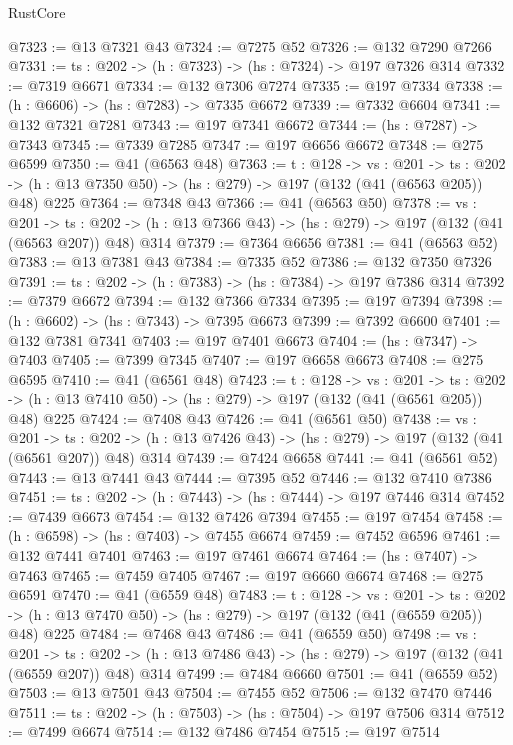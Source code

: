\begin{lexlean}{RustCore}
\begin{coremodule}
@7323 := @13 @7321 @43
@7324 := @7275 @52
@7326 := @132 @7290 @7266
@7331 := {ts : @202} -> (h : @7323) -> (hs : @7324) -> @197 @7326 @314
@7332 := @7319 @6671
@7334 := @132 @7306 @7274
@7335 := @197 @7334
@7338 := (h : @6606) -> (hs : @7283) -> @7335 @6672
@7339 := @7332 @6604
@7341 := @132 @7321 @7281
@7343 := @197 @7341 @6672
@7344 := (hs : @7287) -> @7343
@7345 := @7339 @7285
@7347 := @197 @6656 @6672
@7348 := @275 @6599
@7350 := @41 (@6563 @48)
@7363 := {t : @128} ->
  {vs : @201} ->
  {ts : @202} -> (h : @13 @7350 @50) -> (hs : @279) -> @197 (@132 (@41 (@6563 @205)) @48) @225
@7364 := @7348 @43
@7366 := @41 (@6563 @50)
@7378 := {vs : @201} ->
  {ts : @202} -> (h : @13 @7366 @43) -> (hs : @279) -> @197 (@132 (@41 (@6563 @207)) @48) @314
@7379 := @7364 @6656
@7381 := @41 (@6563 @52)
@7383 := @13 @7381 @43
@7384 := @7335 @52
@7386 := @132 @7350 @7326
@7391 := {ts : @202} -> (h : @7383) -> (hs : @7384) -> @197 @7386 @314
@7392 := @7379 @6672
@7394 := @132 @7366 @7334
@7395 := @197 @7394
@7398 := (h : @6602) -> (hs : @7343) -> @7395 @6673
@7399 := @7392 @6600
@7401 := @132 @7381 @7341
@7403 := @197 @7401 @6673
@7404 := (hs : @7347) -> @7403
@7405 := @7399 @7345
@7407 := @197 @6658 @6673
@7408 := @275 @6595
@7410 := @41 (@6561 @48)
@7423 := {t : @128} ->
  {vs : @201} ->
  {ts : @202} -> (h : @13 @7410 @50) -> (hs : @279) -> @197 (@132 (@41 (@6561 @205)) @48) @225
@7424 := @7408 @43
@7426 := @41 (@6561 @50)
@7438 := {vs : @201} ->
  {ts : @202} -> (h : @13 @7426 @43) -> (hs : @279) -> @197 (@132 (@41 (@6561 @207)) @48) @314
@7439 := @7424 @6658
@7441 := @41 (@6561 @52)
@7443 := @13 @7441 @43
@7444 := @7395 @52
@7446 := @132 @7410 @7386
@7451 := {ts : @202} -> (h : @7443) -> (hs : @7444) -> @197 @7446 @314
@7452 := @7439 @6673
@7454 := @132 @7426 @7394
@7455 := @197 @7454
@7458 := (h : @6598) -> (hs : @7403) -> @7455 @6674
@7459 := @7452 @6596
@7461 := @132 @7441 @7401
@7463 := @197 @7461 @6674
@7464 := (hs : @7407) -> @7463
@7465 := @7459 @7405
@7467 := @197 @6660 @6674
@7468 := @275 @6591
@7470 := @41 (@6559 @48)
@7483 := {t : @128} ->
  {vs : @201} ->
  {ts : @202} -> (h : @13 @7470 @50) -> (hs : @279) -> @197 (@132 (@41 (@6559 @205)) @48) @225
@7484 := @7468 @43
@7486 := @41 (@6559 @50)
@7498 := {vs : @201} ->
  {ts : @202} -> (h : @13 @7486 @43) -> (hs : @279) -> @197 (@132 (@41 (@6559 @207)) @48) @314
@7499 := @7484 @6660
@7501 := @41 (@6559 @52)
@7503 := @13 @7501 @43
@7504 := @7455 @52
@7506 := @132 @7470 @7446
@7511 := {ts : @202} -> (h : @7503) -> (hs : @7504) -> @197 @7506 @314
@7512 := @7499 @6674
@7514 := @132 @7486 @7454
@7515 := @197 @7514

\end{coremodule}
\end{lexlean}

